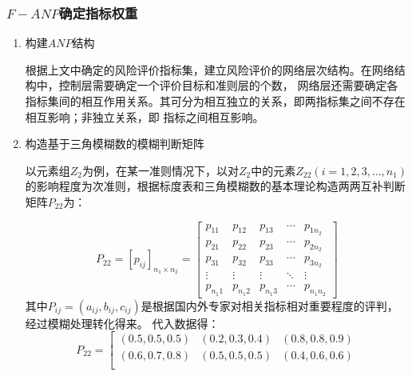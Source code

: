 \documentclass[withoutpreface,bwprint]{cumcmthesis}
\begin{document}
        \subsubsection{$F - ANP$确定指标权重}
            \begin{enumerate}
                \item 构建$ANP$结构 \par
                      根据上文中确定的风险评价指标集，建立风险评价的网络层次结构。在网络结构中，控制层需要确定一个评价目标和准则层的个数，
                      网络层还需要确定各指标集间的相互作用关系。其可分为相互独立的关系，即两指标集之间不存在相互影响；非独立关系，即
                      指标之间相互影响。
                \item 构造基于三角模糊数的模糊判断矩阵 \par
                      以元素组$Z_2$为例，在某一准则情况下，以对$Z_2$中的元素$Z_{22}(i = 1, 2, 3, \dots, n_1)$的影响程度为次准则，根据标度表和三角模糊数的基本理论构造两两互补判断矩阵$P_{22}$为：\par
                        \begin{equation}
                        P_{22}=\left[p_{i j}\right]_{n_{1} \times n_{2}}=\left[
                            \begin{array}{ccccc}
                                p_{11} & p_{12} & p_{13} & \cdots & p_{1 n_{2}} \\
                                p_{21} & p_{22} & p_{23} & \cdots & p_{2 n_{2}} \\
                                p_{31} & p_{32} & p_{33} & \cdots & p_{3 n_{2}} \\
                                \vdots & \vdots & \vdots & \ddots & \vdots \\
                                p_{n_{1} 1} & p_{n_{1} 2} & p_{n_{1} 3} & \cdots & p_{n_{1} n_{2}}
                            \end{array}\right]
                        \end{equation}
                        其中$P_{ij} = (a_{ij}, b_{ij}, c_{ij})$是根据国内外专家对相关指标相对重要程度的评判，经过模糊处理转化得来。
                        代入数据得：
                        \begin{equation*}
                        P_{22}=\left[
                            \begin{array}{ccc}
                                (0.5,0.5,0.5) & (0.2,0.3,0.4) & (0.8,0.8,0.9) \\
                                (0.6,0.7,0.8) & (0.5,0.5,0.5) & (0.4,0.6,0.6) \\

\end{array}
\end{equation*}
\end{enumerate}
\end{document}
